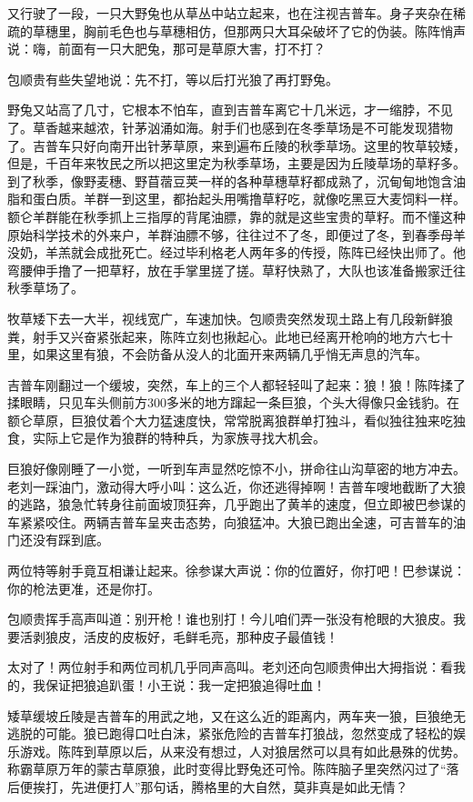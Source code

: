 \par 又行驶了一段，一只大野兔也从草丛中站立起来，也在注视吉普车。身子夹杂在稀疏的草穗里，胸前毛色也与草穗相仿，但那两只大耳朵破坏了它的伪装。陈阵悄声说：嗨，前面有一只大肥兔，那可是草原大害，打不打？
\par 包顺贵有些失望地说：先不打，等以后打光狼了再打野兔。
\par 野兔又站高了几寸，它根本不怕车，直到吉普车离它十几米远，才一缩脖，不见了。草香越来越浓，针茅汹涌如海。射手们也感到在冬季草场是不可能发现猎物了。吉普车只好向南开出针茅草原，来到遍布丘陵的秋季草场。这里的牧草较矮，但是，千百年来牧民之所以把这里定为秋季草场，主要是因为丘陵草场的草籽多。到了秋季，像野麦穗、野苜蓿豆荚一样的各种草穗草籽都成熟了，沉甸甸地饱含油脂和蛋白质。羊群一到这里，都抬起头用嘴撸草籽吃，就像吃黑豆大麦饲料一样。额仑羊群能在秋季抓上三指厚的背尾油膘，靠的就是这些宝贵的草籽。而不懂这种原始科学技术的外来户，羊群油膘不够，往往过不了冬，即便过了冬，到春季母羊没奶，羊羔就会成批死亡。经过毕利格老人两年多的传授，陈阵已经快出师了。他弯腰伸手撸了一把草籽，放在手掌里搓了搓。草籽快熟了，大队也该准备搬家迁往秋季草场了。
\par 牧草矮下去一大半，视线宽广，车速加快。包顺贵突然发现土路上有几段新鲜狼粪，射手又兴奋紧张起来，陈阵立刻也揪起心。此地已经离开枪响的地方六七十里，如果这里有狼，不会防备从没人的北面开来两辆几乎悄无声息的汽车。
\par 吉普车刚翻过一个缓坡，突然，车上的三个人都轻轻叫了起来：狼！狼！陈阵揉了揉眼睛，只见车头侧前方300多米的地方蹿起一条巨狼，个头大得像只金钱豹。在额仑草原，巨狼仗着个大力猛速度快，常常脱离狼群单打独斗，看似独往独来吃独食，实际上它是作为狼群的特种兵，为家族寻找大机会。
\par 巨狼好像刚睡了一小觉，一听到车声显然吃惊不小，拼命往山沟草密的地方冲去。老刘一踩油门，激动得大呼小叫：这么近，你还逃得掉啊！吉普车嗖地截断了大狼的逃路，狼急忙转身往前面坡顶狂奔，几乎跑出了黄羊的速度，但立即被巴参谋的车紧紧咬住。两辆吉普车呈夹击态势，向狼猛冲。大狼已跑出全速，可吉普车的油门还没有踩到底。
\par 两位特等射手竟互相谦让起来。徐参谋大声说：你的位置好，你打吧！巴参谋说：你的枪法更准，还是你打。
\par 包顺贵挥手高声叫道：别开枪！谁也别打！今儿咱们弄一张没有枪眼的大狼皮。我要活剥狼皮，活皮的皮板好，毛鲜毛亮，那种皮子最值钱！
\par 太对了！两位射手和两位司机几乎同声高叫。老刘还向包顺贵伸出大拇指说：看我的，我保证把狼追趴蛋！小王说：我一定把狼追得吐血！
\par 矮草缓坡丘陵是吉普车的用武之地，又在这么近的距离内，两车夹一狼，巨狼绝无逃脱的可能。狼已跑得口吐白沫，紧张危险的吉普车打狼战，忽然变成了轻松的娱乐游戏。陈阵到草原以后，从来没有想过，人对狼居然可以具有如此悬殊的优势。称霸草原万年的蒙古草原狼，此时变得比野兔还可怜。陈阵脑子里突然闪过了“落后便挨打，先进便打人”那句话，腾格里的大自然，莫非真是如此无情？
